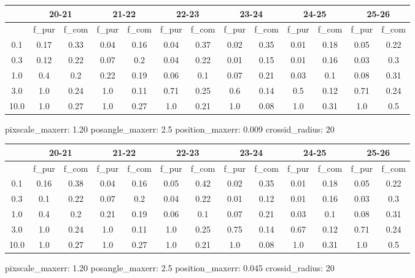 \documentclass{article}
\begin{document}
\begin{figure}[H]
\centering
\begin{tabular}{|c|c|c|c|c|c|c|c|c|c|c|c|c|}
\hline
\multicolumn{1}{|c|}{} & \multicolumn{2}{|c|}{20-21} & \multicolumn{2}{|c|}{21-22} & \multicolumn{2}{|c|}{22-23} & \multicolumn{2}{|c|}{23-24} & \multicolumn{2}{|c|}{24-25} & \multicolumn{2}{|c|}{25-26}\\
\hline \hline
 & f\_pur & f\_com & f\_pur & f\_com & f\_pur & f\_com & f\_pur & f\_com & f\_pur & f\_com & f\_pur & f\_com \\
\hline
0.1 & 0.17 & 0.33 & 0.04 & 0.16 & 0.04 & 0.37 & 0.02 & 0.35 & 0.01 & 0.18 & 0.05 & 0.22\\
\hline
0.3 & 0.12 & 0.22 & 0.07 & 0.2 & 0.04 & 0.22 & 0.01 & 0.15 & 0.01 & 0.16 & 0.03 & 0.3\\
\hline
1.0 & 0.4 & 0.2 & 0.22 & 0.19 & 0.06 & 0.1 & 0.07 & 0.21 & 0.03 & 0.1 & 0.08 & 0.31\\
\hline
3.0 & 1.0 & 0.24 & 1.0 & 0.11 & 0.71 & 0.25 & 0.6 & 0.14 & 0.5 & 0.12 & 0.71 & 0.24\\
\hline
10.0 & 1.0 & 0.27 & 1.0 & 0.27 & 1.0 & 0.21 & 1.0 & 0.08 & 1.0 & 0.31 & 1.0 & 0.5\\
\hline
\end{tabular}
\caption{pixscale\_maxerr: 1.20 posangle\_maxerr: 2.5 position\_maxerr: 0.009 crossid\_radius: 20}
\end{figure}

\begin{figure}[H]
\centering
\begin{tabular}{|c|c|c|c|c|c|c|c|c|c|c|c|c|}
\hline
\multicolumn{1}{|c|}{} & \multicolumn{2}{|c|}{20-21} & \multicolumn{2}{|c|}{21-22} & \multicolumn{2}{|c|}{22-23} & \multicolumn{2}{|c|}{23-24} & \multicolumn{2}{|c|}{24-25} & \multicolumn{2}{|c|}{25-26}\\
\hline \hline
 & f\_pur & f\_com & f\_pur & f\_com & f\_pur & f\_com & f\_pur & f\_com & f\_pur & f\_com & f\_pur & f\_com \\
\hline
0.1 & 0.16 & 0.38 & 0.04 & 0.16 & 0.05 & 0.42 & 0.02 & 0.35 & 0.01 & 0.18 & 0.05 & 0.22\\
\hline
0.3 & 0.1 & 0.22 & 0.07 & 0.2 & 0.04 & 0.22 & 0.01 & 0.12 & 0.01 & 0.16 & 0.03 & 0.3\\
\hline
1.0 & 0.4 & 0.2 & 0.21 & 0.19 & 0.06 & 0.1 & 0.07 & 0.21 & 0.03 & 0.1 & 0.08 & 0.31\\
\hline
3.0 & 1.0 & 0.24 & 1.0 & 0.11 & 1.0 & 0.25 & 0.75 & 0.14 & 0.67 & 0.12 & 0.71 & 0.24\\
\hline
10.0 & 1.0 & 0.27 & 1.0 & 0.27 & 1.0 & 0.21 & 1.0 & 0.08 & 1.0 & 0.31 & 1.0 & 0.5\\
\hline
\end{tabular}
\caption{pixscale\_maxerr: 1.20 posangle\_maxerr: 2.5 position\_maxerr: 0.045 crossid\_radius: 20}
\end{figure}
\end{document}
